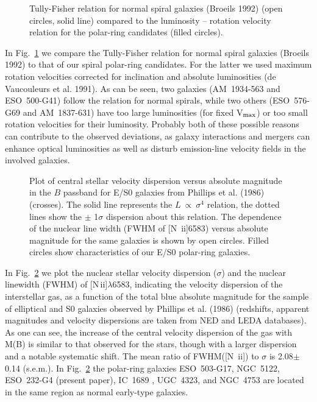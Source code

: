 \setcounter{figure}{2}
\begin{figure}
\caption{Tully-Fisher  relation for normal spiral  galaxies  (Broeils 1992)
(open circles, solid line) compared to the luminosity -- rotation  velocity
relation for the polar-ring candidates (filled circles).}
\label{tf}
\end{figure}

In  Fig.~\ref{tf}  we compare the  Tully-Fisher  relation for normal spiral
galaxies (Broeils 1992) to that of our spiral  polar-ring  candidates.  For
the latter we used maximum  rotation  velocities  corrected for inclination
and absolute  luminosities  (de Vaucouleurs et al.  1991).  As can be seen,
two galaxies  (AM~1934-563 and ESO~500-G41)  follow the relation for normal
spirals,  while two others  (ESO~576-G69  and  AM~1837-631)  have too large
luminosities (for fixed V$_{\rm max}$) or too small rotation velocities for
their  luminosity.  Probably both of these possible  reasons can contribute
to the observed  deviations, as galaxy interactions and mergers can enhance
optical  luminosities as well as disturb  emission-line  velocity fields in
the involved galaxies.

\setcounter{figure}{3}
\begin{figure}
\caption{Plot  of  central  stellar  velocity  dispersion  versus  absolute
magnitude  in the $B$  passband  for E/S0  galaxies  from  Phillips  et al.
(1986)  (crosses).  The  solid  line  represents  the  $L~\propto~\sigma^4$
relation, the dotted lines show the $\pm$ 1$\sigma$  dispersion  about this
relation.  The  dependence  of the  nuclear  line width  (FWHM of  [N\,{\sc
ii}]6583) versus absolute  magnitude for the same galaxies is shown by open
circles.  Filled  circles  show  characteristics  of  our  E/S0  polar-ring
galaxies.}
\label{2mb}
\end{figure}

In  Fig.~\ref{2mb}   we  plot  the  nuclear  stellar  velocity   dispersion
($\sigma$) and the nuclear linewidth (FWHM) of [N\,{\sc  ii}]$\lambda$6583,
indicating the velocity  dispersion of the interstellar  gas, as a function
of the total blue absolute  magnitude for the sample of  elliptical  and S0
galaxies   observed  by  Phillips  et  al.  (1986)   (redshifts,   apparent
magnitudes and velocity dispersions are taken from NED and LEDA databases).
As one can see, the increase of the central velocity  dispersion of the gas
with M(B) is similar to that  observed for the stars,  though with a larger
dispersion and a notable systematic shift.  The mean ratio of FWHM([N\,{\sc
ii}])  to  $\sigma$  is  2.08$\pm$0.14   (s.e.m.).  In  Fig.~\ref{2mb}  the
polar-ring  galaxies  ESO~503-G17,  NGC~5122,  ESO~232-G4  (present paper),
IC~1689 \cite{ht}, UGC~4323, and NGC~4753 \cite{rc} are located in the same
region as normal early-type galaxies.

